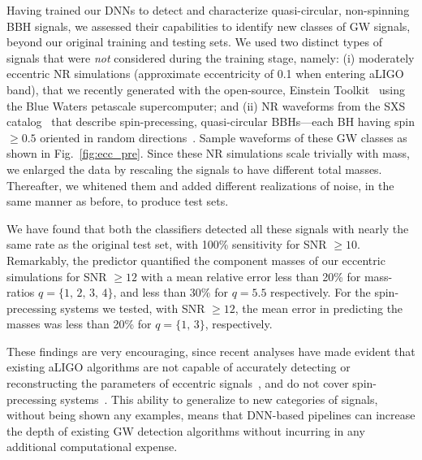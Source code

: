 \documentclass[aps,prd,%
amsmath,floats,floatfix, twocolumn, superscriptaddress,nofootinbib,showpacs]{revtex4-1}
\begin{document}
\noindent Having trained our DNNs to detect and characterize quasi-circular, non-spinning BBH signals, we assessed their capabilities to identify new classes of GW signals, beyond our original training and testing sets. We used two distinct types of signals that were \textit{not} considered during the training stage, namely: (i) moderately eccentric NR simulations (approximate eccentricity of 0.1 when entering aLIGO band), that we recently generated with the open-source, Einstein Toolkit~\cite{ETL:2012CQGra} using the Blue Waters petascale supercomputer; and (ii) NR waveforms from the SXS catalog~\cite{chu:2016CQG} that describe spin-precessing, quasi-circular BBHs---each BH having spin $\ge 0.5$ oriented in random directions~\cite{chu:2016CQG}. Sample waveforms of these GW classes as shown in Fig.~\ref{fig:ecc_pre}. Since these NR simulations scale trivially with mass, we enlarged the data by rescaling the signals to have different total masses. Thereafter, we whitened them and added different realizations of noise, in the same manner as before, to produce test sets.

We have found that both the classifiers detected all these signals with nearly the same rate as the original test set, with 100\% sensitivity for SNR $\ge 10$. Remarkably, the predictor quantified the component masses of our eccentric simulations for SNR $\ge 12$ with a mean relative error less than 20\%  for mass-ratios \(q=\{1,\,2,\,3,\,4\}\), and less than 30\% for \(q=5.5\) respectively. For the spin-precessing systems we tested, with SNR $\ge 12$, the mean error in predicting the masses was less than 20\% for \(q=\{1,\,3\}\), respectively.

These findings are very encouraging, since recent analyses have made evident that existing aLIGO algorithms are not capable of accurately detecting or reconstructing the parameters of eccentric signals~\cite{Huerta:2017a,Huerta:2014,Huerta:2013a}, and do not cover spin-precessing systems~\cite{2016CQGra..33u5004U}.  This ability to generalize to new categories of signals, without being shown any examples, means that DNN-based pipelines can increase the depth of existing GW detection algorithms without incurring in any additional computational expense. 
\end{document}

